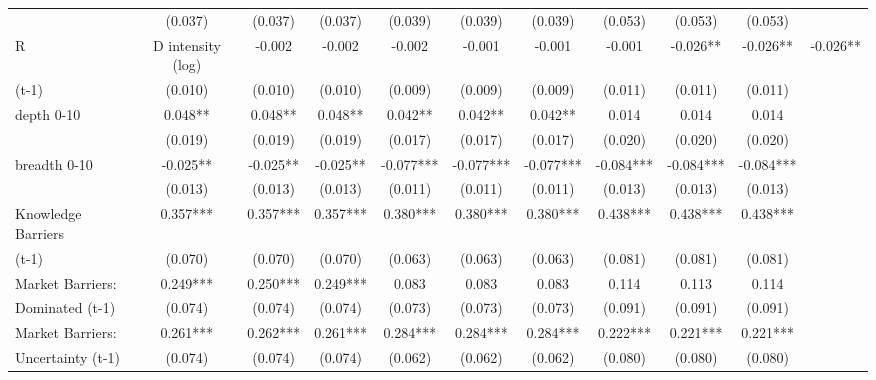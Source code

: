 \begin{table}[htbp]
\begin{tabular}{l*{9}{c}}
                    &     (0.037)   &     (0.037)   &     (0.037)   &     (0.039)   &     (0.039)   &     (0.039)   &     (0.053)   &     (0.053)   &     (0.053)   \\
R&D intensity (log) &      -0.002   &      -0.002   &      -0.002   &      -0.001   &      -0.001   &      -0.001   &      -0.026** &      -0.026** &      -0.026** \\
(t-1)               &     (0.010)   &     (0.010)   &     (0.010)   &     (0.009)   &     (0.009)   &     (0.009)   &     (0.011)   &     (0.011)   &     (0.011)   \\
depth 0-10          &       0.048** &       0.048** &       0.048** &       0.042** &       0.042** &       0.042** &       0.014   &       0.014   &       0.014   \\
                    &     (0.019)   &     (0.019)   &     (0.019)   &     (0.017)   &     (0.017)   &     (0.017)   &     (0.020)   &     (0.020)   &     (0.020)   \\
breadth 0-10        &      -0.025** &      -0.025** &      -0.025** &      -0.077***&      -0.077***&      -0.077***&      -0.084***&      -0.084***&      -0.084***\\
                    &     (0.013)   &     (0.013)   &     (0.013)   &     (0.011)   &     (0.011)   &     (0.011)   &     (0.013)   &     (0.013)   &     (0.013)   \\
Knowledge Barriers  &       0.357***&       0.357***&       0.357***&       0.380***&       0.380***&       0.380***&       0.438***&       0.438***&       0.438***\\
(t-1)               &     (0.070)   &     (0.070)   &     (0.070)   &     (0.063)   &     (0.063)   &     (0.063)   &     (0.081)   &     (0.081)   &     (0.081)   \\
Market Barriers:    &       0.249***&       0.250***&       0.249***&       0.083   &       0.083   &       0.083   &       0.114   &       0.113   &       0.114   \\
Dominated (t-1)     &     (0.074)   &     (0.074)   &     (0.074)   &     (0.073)   &     (0.073)   &     (0.073)   &     (0.091)   &     (0.091)   &     (0.091)   \\
Market Barriers:    &       0.261***&       0.262***&       0.261***&       0.284***&       0.284***&       0.284***&       0.222***&       0.221***&       0.221***\\
Uncertainty (t-1)   &     (0.074)   &     (0.074)   &     (0.074)   &     (0.062)   &     (0.062)   &     (0.062)   &     (0.080)   &     (0.080)   &     (0.080)   \\

\end{tabular}
\end{table}
